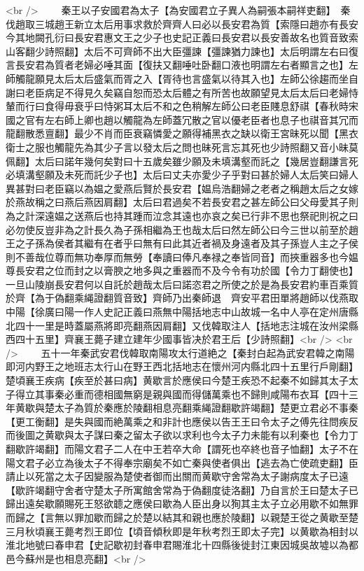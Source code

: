 <br />
　　秦王以子安國君為太子【為安國君立子異人為嗣張本嗣祥吏翻】　秦伐趙取三城趙王新立太后用事求救於齊齊人曰必以長安君為質【索隱曰趙亦有長安今其地闕孔衍曰長安君惠文王之少子也史記正義曰長安君以長安善故名也質音致索山客翻少詩照翻】太后不可齊師不出大臣彊諫【彊諫猶力諫也】太后明謂左右曰復言長安君為質者老婦必唾其面【復扶又翻唾吐卧翻口液也明謂左右者顯言之也】左師觸龍願見太后太后盛氣而胥之入【胥待也言盛氣以待其入也】左師公徐趨而坐自謝曰老臣病足不得見久矣竊自恕而恐太后體之有所苦也故願望見太后太后曰老婦恃輦而行曰食得毋衰乎曰恃粥耳太后不和之色稍解左師公曰老臣賤息舒祺【春秋時宋國之官有左右師上卿也趙以觸龍為左師蓋冗散之官以優老臣者也息子也祺音其冗而龍翻散悉亶翻】最少不肖而臣衰竊憐愛之願得補黑衣之缺以衛王宮昧死以聞【黑衣衛士之服也觸龍先為其少子言以發太后之問也昧死言忘其死也少詩照翻又音小昧莫佩翻】太后曰諾年幾何矣對曰十五歲矣雖少願及未填溝壑而託之【幾居豈翻謙言死必填溝壑願及未死而託少子也】太后曰丈夫亦愛少子乎對曰甚於婦人太后笑曰婦人異甚對曰老臣竊以為媪之愛燕后賢於長安君【媪烏浩翻婦之老者之稱趙太后之女嫁於燕故稱之曰燕后燕因肩翻】太后曰君過矣不若長安君之甚左師公曰父母愛其子則為之計深遠媪之送燕后也持其踵而泣念其遠也亦哀之矣已行非不思也祭祀則祝之曰必勿使反豈非為之計長久為子孫相繼為王也哉太后曰然左師公曰今三世以前至於趙王之子孫為侯者其繼有在者乎曰無有曰此其近者禍及身遠者及其子孫豈人主之子侯則不善哉位尊而無功奉厚而無勞【奉讀曰俸凡奉禄之奉皆同音】而挾重器多也今媪尊長安君之位而封之以膏腴之地多與之重器而不及今令有功於國【令力丁翻使也】一旦山陵崩長安君何以自託於趙哉太后曰諾恣君之所使之於是為長安君約車百乘質於齊【為于偽翻乘䋲證翻質音致】齊師乃出秦師退　齊安平君田單將趙師以伐燕取中陽【徐廣曰陽一作人史記正義曰燕無中陽括地志中山故城一名中人亭在定州唐縣北四十一里是時蓋屬燕將即亮翻燕因肩翻】又伐韓取注人【括地志注城在汝州梁縣西四十五里】齊襄王薨子建立建年少國事皆决於君王后【少詩照翻】<br />
<br />
　　五十一年秦武安君伐韓取南陽攻太行道絶之【秦封白起為武安君韓之南陽即河内野王之地班志太行山在野王西北括地志在懷州河内縣北四十五里行戶剛翻】　楚頃襄王疾病【疾至於甚曰病】黄歇言於應侯曰今楚王疾恐不起秦不如歸其太子太子得立其事秦必重而德相國無窮是親與國而得儲萬乘也不歸則咸陽布衣耳【四十三年黄歇與楚太子為質於秦應於陵翻相息亮翻乘䋲證翻歇許竭翻】楚更立君必不事秦【更工衡翻】是失與國而絶萬乘之和非計也應侯以告王王曰令太子之傅先往問疾反而後圖之黄歇與太子謀曰秦之留太子欲以求利也今太子力未能有以利秦也【令力丁翻歇許竭翻】而陽文君子二人在中王若卒大命【謂死也卒終也音子恤翻】太子不在陽文君子必立為後太子不得奉宗廟矣不如亡秦與使者俱出【逃去為亡使疏吏翻】臣請止以死當之太子因變服為楚使者御而出關而黄歇守舍常為太子謝病度太子已遠【歇許竭翻守舍者守楚太子所寓館舍常為于偽翻度徒洛翻】乃自言於王曰楚太子已歸出遠矣歇願賜死王怒欲聼之應侯曰歇為人臣出身以狥其主太子立必用歇不如無罪而歸之【言無以罪加歇而歸之於楚以結其和親也應於陵翻】以親楚王從之黄歇至楚三月秋頃襄王薨考烈王即位【頃音傾秋即是年秋考烈王即太子完】以黄歇為相封以淮北地號曰春申君【史記歇初封春申君賜淮北十四縣後徙封江東因城吳故墟以為都邑今蘇州是也相息亮翻】<br />
